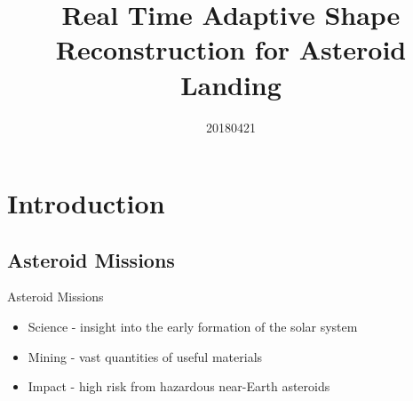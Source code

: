 \documentclass[11pt,professionalfonts]{beamer}
\title[Asteroid Reconstruction]{\large\textbf Real Time Adaptive Shape Reconstruction for Asteroid Landing}
\author{\vspace*{-0.3cm}}
\institute{
	\footnotesize
	{\normalsize\bf{Shankar Kulumani}}\\
	\vspace*{0.2cm}
  	\textbf{Department of Mechanical \& Aerospace Engineering}\\ \vspace*{0.5cm}
 	\begin{figure} %
       	\texttt{[image: gw\_txh\_2cs\_pos]}
  	\end{figure}
}
\date{20180421}
\begin{document}

\setcounter{framenumber}{-1}
\begin{frame} %
  \titlepage
\end{frame}   %

\section[Introduction]{Introduction}
\subsection[Motivation]{Asteroid Missions}  
\begin{frame}{Asteroid Missions}
\begin{itemize}
    \item<1-> Science - insight into the early formation of the solar system
    \item<2-> Mining - vast quantities of useful materials
    \item<3-> Impact - high risk from hazardous near-Earth asteroids
\end{itemize}    

\end{frame}
\end{document}
